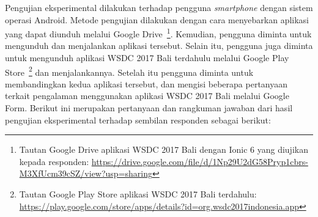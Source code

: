 Pengujian eksperimental dilakukan terhadap pengguna \textit{smartphone} dengan sistem operasi Android. Metode pengujian dilakukan dengan cara menyebarkan aplikasi yang dapat diunduh melalui Google Drive~\footnote{Tautan Google Drive aplikasi WSDC 2017 Bali dengan Ionic 6 yang diujikan kepada responden: \url{https://drive.google.com/file/d/1Np29U2dG58Pryp1cbrs-M3XfUcm39cSZ/view?usp=sharing}}. Kemudian, pengguna diminta untuk mengunduh dan menjalankan aplikasi tersebut. Selain itu, pengguna juga diminta untuk mengunduh aplikasi WSDC 2017 Bali terdahulu melalui Google Play Store~\footnote{Tautan Google Play Store aplikasi WSDC 2017 Bali terdahulu: \url{https://play.google.com/store/apps/details?id=org.wsdc2017indonesia.app}} dan menjalankannya. Setelah itu pengguna diminta untuk membandingkan kedua aplikasi tersebut, dan mengisi beberapa pertanyaan terkait pengalaman menggunakan aplikasi WSDC 2017 Bali melalui Google Form. Berikut ini merupakan pertanyaan dan rangkuman jawaban dari hasil pengujian eksperimental terhadap sembilan responden sebagai berikut:

